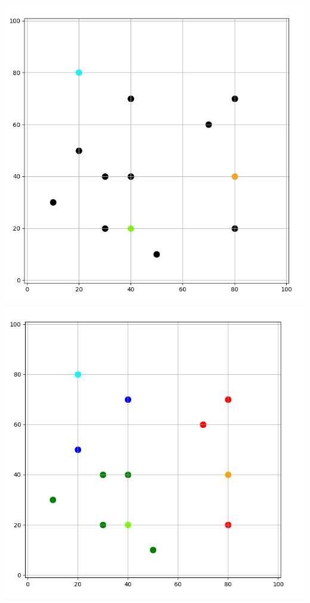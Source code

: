 \documentclass[10pt,class=report,crop=false]{standalone}
\begin{document}
\begin{activite}[Barycentres]
\begin{enumerate}
	\begin{center}
		\includegraphics[scale=\myscale,scale=0.173]{ecran-barycentres-7a}\quad
		\includegraphics[scale=\myscale,scale=0.18]{ecran-barycentres-7b}\quad

\end{center}
\end{enumerate}
\end{activite}
\end{document}
